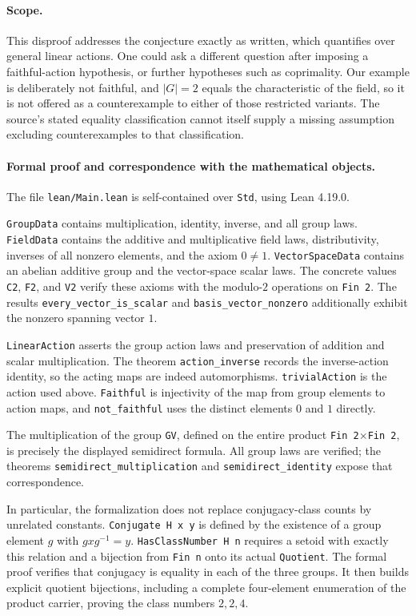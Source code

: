 \documentclass[11pt]{article}
\begin{document}
\paragraph{Scope.}
This disproof addresses the conjecture exactly as written, which
quantifies over general linear actions. One could ask a different
question after imposing a faithful-action hypothesis, or further
hypotheses such as coprimality. Our example is deliberately not faithful,
and $|G|=2$ equals the characteristic of the field, so it is not offered
as a counterexample to either of those restricted variants.
The source's stated equality classification cannot itself supply a
missing assumption excluding counterexamples to that classification.

\paragraph{Formal proof and correspondence with the mathematical objects.}
The file \texttt{lean/Main.lean} is self-contained over \texttt{Std},
using Lean 4.19.0.

\texttt{GroupData} contains multiplication, identity, inverse, and
all group laws. \texttt{FieldData} contains the additive and
multiplicative field laws, distributivity, inverses of all nonzero
elements, and the axiom $0\ne1$. \texttt{VectorSpaceData} contains an
abelian additive group and the vector-space scalar laws.
The concrete values \texttt{C2}, \texttt{F2}, and \texttt{V2}
verify these axioms with the modulo-$2$ operations on \texttt{Fin 2}.
The results \texttt{every\_vector\_is\_scalar} and
\texttt{basis\_vector\_nonzero} additionally exhibit the nonzero
spanning vector $1$.

\texttt{LinearAction} asserts the group action laws and preservation
of addition and scalar multiplication.
The theorem \texttt{action\_inverse} records the inverse-action identity,
so the acting maps are indeed automorphisms.
\texttt{trivialAction} is the action used above.
\texttt{Faithful} is injectivity of the map from group elements to
action maps, and \texttt{not\_faithful} uses the distinct elements
$0$ and $1$ directly.

The multiplication of the group \texttt{GV}, defined on the entire
product \texttt{Fin 2}$\times$\texttt{Fin 2}, is precisely the displayed
semidirect formula. All group laws are verified; the theorems
\texttt{semidirect\_multiplication} and
\texttt{semidirect\_identity} expose that correspondence.

In particular, the formalization does not replace conjugacy-class
counts by unrelated constants.
\texttt{Conjugate H x y} is defined by the existence of a group element
$g$ with $gxg^{-1}=y$.
\texttt{HasClassNumber H n} requires a setoid with exactly this
relation and a bijection from \texttt{Fin n} onto its actual
\texttt{Quotient}.
The formal proof verifies that conjugacy is equality in each of the
three groups. It then builds explicit quotient bijections, including
a complete four-element enumeration of the product carrier, proving
the class numbers $2,2,4$.
\end{document}
